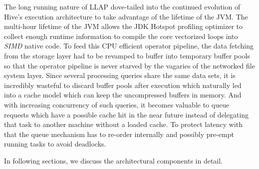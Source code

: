 The long running nature of LLAP dove-tailed into the continued evolution of Hive's execution architecture to take advantage of the lifetime of the JVM. The multi-hour 
lifetime of the JVM allows the JDK Hotspot profiling optimizer to collect enough runtime information
to compile the core vectorized loops into \emph{SIMD} native code. To feed this CPU efficient operator pipeline, the data fetching from the storage layer
had to be revamped to buffer into temporary buffer pools so that the operator pipeline is never starved by the vagaries of the networked file
system layer. Since several processing queries share the same data sets, it is incredibly wasteful to discard buffer pools after execution which
naturally led into a cache model which can keep the uncompressed buffers in memory. And with increasing concurrency of such queries, it becomes valuable
to queue requests which have a possible cache hit in the near future instead of delegating that task to another machine without a loaded cache. To protect
latency with that the queue mechanism has to re-order internally and possibly pre-empt running tasks to avoid deadlocks. 

In following sections, we discuss the architectural components in detail.
